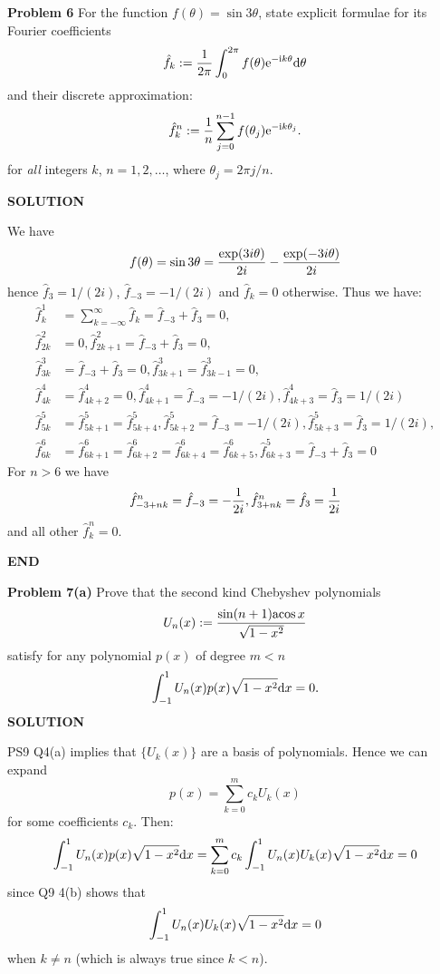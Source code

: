 \documentclass[12pt,a4paper]{article}
\def\acos{ {\rm acos}\, }
\begin{document}
\textbf{Problem 6} For the function $f(\ensuremath{\theta}) = \sin 3 \ensuremath{\theta}$, state explicit formulae for its Fourier coefficients
\[
\hat f_k := {1 \over 2\ensuremath{\pi}} \int_0^{2\ensuremath{\pi}} f(\ensuremath{\theta}) {\rm e}^{-{\rm i} k \ensuremath{\theta}} {\rm d}\ensuremath{\theta}
\]
and  their discrete approximation:
\[
\hat f_k^n := {1 \over n} \sum_{j=0}^{n-1} f(\ensuremath{\theta}_j) {\rm e}^{-{\rm i} k \ensuremath{\theta}_j}.
\]
for \emph{all} integers $k$, $n = 1,2,\ensuremath{\ldots}$, where $\ensuremath{\theta}_j = 2\ensuremath{\pi} j/n$.

\textbf{SOLUTION}

We have
\[
f(\ensuremath{\theta}) = \sin 3 \ensuremath{\theta} = { \exp(3 i \ensuremath{\theta}) \over 2 i} -  { \exp(-3 i \ensuremath{\theta}) \over 2 i}
\]
hence $\hat f_3 = 1/(2i)$, $\hat f_{-3} = -1/(2i)$ and $\hat f_k = 0$ otherwise. Thus we have:
\begin{align*}
\hat f_k^1 &= \sum_{k=-\ensuremath{\infty}}^\ensuremath{\infty} \hat f_k = \hat f_{-3} + \hat f_3 = 0, \\
\hat f_{2k}^2 &= 0, \hat f_{2k+1}^2 = \hat f_{-3} + \hat f_3 = 0, \\
\hat f_{3k}^3 &= \hat f_{-3} + \hat f_3 = 0, \hat f_{3k+1}^3 = \hat f_{3k-1}^3 = 0, \\
\hat f_{4k}^4 &= \hat f_{4k+2}^4 = 0, \hat f_{4k+1}^4 = \hat f_{-3} = -1/(2i), \hat f_{4k+3}^4 = \hat f_{3} = 1/(2i) \\
\hat f_{5k}^5 &= \hat f_{5k+1}^5 = \hat f_{5k+4}^5,  \hat f_{5k+2}^5 = \hat f_{-3} = -1/(2i),  \hat f_{5k+3}^5 = \hat f_{3} = 1/(2i), \\
\hat f_{6k}^6 &= \hat f_{6k+1}^6 = \hat f_{6k+2}^6 = \hat f_{6k+4}^6 = \hat f_{6k+5}^6,  \hat f_{6k+3}^5 = \hat f_{-3} + \hat f_{3} = 0
\end{align*}
For $n > 6$ we have
\[
\hat f_{-3+nk}^n =  \hat f_{-3} = -{1 \over 2i},\hat f_{3+nk}^n =  \hat f_{3} = {1 \over 2i}
\]
and all other $\hat f_k^n = 0$.

\textbf{END}

\textbf{Problem 7(a)} Prove that the second kind Chebyshev polynomials
\[
U_n(x) := {\sin (n+1) \acos x \over \sqrt{1-x^2}}
\]
satisfy for any polynomial $p(x)$ of degree $m < n$
\[
\int_{-1}^1 U_n(x) p(x) \sqrt{1-x^2} {\rm d}x = 0.
\]
\textbf{SOLUTION}

PS9 Q4(a) implies that $\{U_k(x)\}$ are a basis of polynomials. Hence we can  expand
\[
p(x) = \ensuremath{\sum}_{k=0}^m c_k U_k(x)
\]
for some coefficients $c_k$. Then:
\[
\int_{-1}^1 U_n(x) p(x) \sqrt{1-x^2} {\rm d}x 
= \ensuremath{\sum}_{k=0}^m c_k \int_{-1}^1 U_n(x) U_k(x) \sqrt{1-x^2} {\rm d}x  = 0
\]
since Q9 4(b) shows that
\[
\int_{-1}^1 U_n(x) U_k(x) \sqrt{1-x^2} {\rm d}x  = 0
\]
when $k \ensuremath{\neq} n$ (which is always true since $k < n$).
\end{document}
